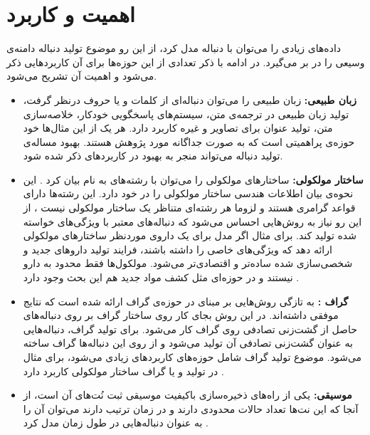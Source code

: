 \section{اهمیت و کاربرد}
داده‌های زیادی را می‌توان با دنباله مدل کرد، از این رو موضوع تولید دنباله دامنه‌ی وسیعی را در بر می‌گیرد.
در ادامه با ذکر تعدادی از این حوزه‌ها برای آن کاربرد‌هایی ذکر می‌شود و اهمیت آن تشریح می‌شود.
\begin{itemize}
	\item 
	\textbf{ زبان طبیعی:}
زبان طبیعی را می‌توان	دنباله‌ای از کلمات و یا حروف درنظر گرفت، تولید زبان طبیعی در ترجمه‌ی متن، سیستم‌های پاسخگویی خودکار، خلاصه‌سازی متن، تولید عنوان برای تصاویر و غیره کاربرد دارد.
هر یک از این مثال‌ها خود حوزه‌ی پراهمیتی است که به صورت جداگانه مورد پژوهش هستند.
بهبود مساله‌ی تولید دنباله می‌تواند منجر به بهبود در کاربرد‌های ذکر شده شود. 
		\item 
		\textbf{ ساختار مولکولی:}
		ساختارهای مولکولی را می‌توان با رشته‌های به نام
		بیان کرد
		\cite{weininger1988smiles}.
		این نحوه‌ی بیان اطلاعات هندسی ساختار مولکولی را در خود دارد. این رشته‌ها دارای قواعد گرامری هستند و لزوما هر رشته‌ای متناظر یک ساختار مولکولی نیست
		\cite{ORGAN}،
		از این رو نیاز به روش‌هایی احساس می‌شود که دنباله‌های معتبر با ویژگی‌های خواسته شده تولید کند. 
برای مثال اگر مدل برای یک داروی موردنظر ساختار‌های مولکولی ارائه دهد که ویژگی‌های خاصی را داشته باشند، فرایند تولید دارو‌های جدید و شخصی‌سازی شده ساده‌تر و اقتصادی‌تر می‌شود. مولکول‌ها فقط محدود به دارو نیستند و در حوزه‌ای مثل کشف مواد جدید هم این بحث‌ وجود دارد
		\cite{ORGAN}.
		\item 
		\textbf{ گراف :}
		به تازگی روش‌هایی بر مبنای
در حوزه‌ی گراف ارائه شده است که نتایج موفقی داشته‌اند.
 در این روش بجای کار روی ساختار گراف بر روی دنباله‌های حاصل از گشت‌زنی تصادفی روی گراف کار می‌شود. 
برای تولید گراف، دنباله‌هایی به عنوان گشت‌زنی تصادفی آن تولید می‌شود و از روی این دنباله‌ها گراف ساخته می‌شود.
موضوع تولید گراف شامل حوزه‌های کاربرد‌های زیادی می‌شود، برای مثال در تولید
و یا گراف ساختار مولکولی کاربرد دارد
		\cite{Aleksandar18NetGAN, Jiaxuan18GraphRNN}.
		
		\item 
		\textbf{ موسیقی:}
				یکی از راه‌های ذخیره‌سازی باکیفیت موسیقی ثبت نُت‌های آن است، از آنجا که این نت‌ها تعداد حالات محدودی دارند و در زمان ترتیب دارند می‌توان آن را به عنوان‌ دنباله‌هایی در طول زمان مدل کرد
				\cite{SeqGAN}.
\end{itemize}


